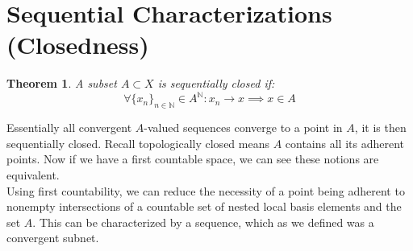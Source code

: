 \documentclass{exam}
\newtheorem{thm}{Theorem}[section]
\begin{document}
\section*{Sequential Characterizations (Closedness)}
\begin{thm}
A subset $A \subset X$ is sequentially closed if:
\begin{equation*}
  \forall \{x_n\}_{n \in \mathbb{N}} \in A^\mathbb{N}: x_n \xrightarrow{} x \implies x \in A
\end{equation*}
\end{thm}
Essentially all convergent $A$-valued sequences converge to a point in $A$, it is then sequentially closed. Recall topologically closed means $A$ contains all its adherent points. Now if we have a first countable space, we can see these notions are equivalent.\\

Using first countability, we can reduce the necessity of a point being adherent to nonempty intersections of a countable set of nested local basis elements and the set $A$. This can be characterized by a sequence, which as we defined was a convergent subnet.\\
\end{document}
